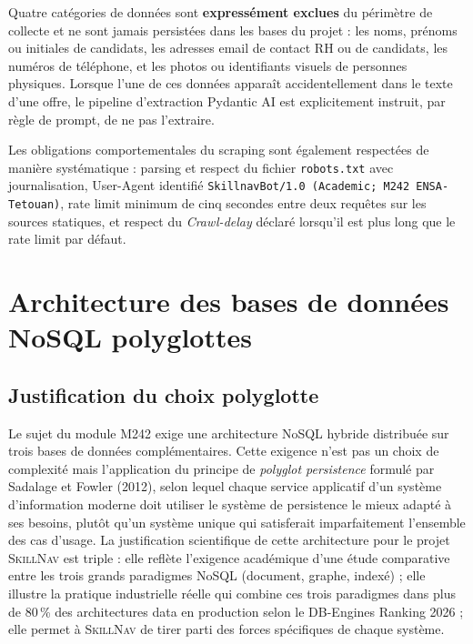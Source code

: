 \documentclass[11pt,a4paper,openany]{report}
\newcommand{\skillnav}{\textsc{SkillNav}\xspace}
\begin{document}
Quatre cat\'egories de donn\'ees sont \textbf{express\'ement exclues} du p\'erim\`etre de collecte et ne sont jamais persist\'ees dans les bases du projet : les noms, pr\'enoms ou initiales de candidats, les adresses email de contact RH ou de candidats, les num\'eros de t\'el\'ephone, et les photos ou identifiants visuels de personnes physiques. Lorsque l'une de ces donn\'ees appara\^it accidentellement dans le texte d'une offre, le pipeline d'extraction Pydantic AI est explicitement instruit, par r\`egle de prompt, de ne pas l'extraire.

Les obligations comportementales du scraping sont \'egalement respect\'ees de mani\`ere syst\'ematique : parsing et respect du fichier \texttt{robots.txt} avec journalisation, User-Agent identifi\'e \texttt{SkillnavBot/1.0 (Academic; M242 ENSA-Tetouan)}, rate limit minimum de cinq secondes entre deux requ\^etes sur les sources statiques, et respect du \emph{Crawl-delay} d\'eclar\'e lorsqu'il est plus long que le rate limit par d\'efaut.

\section{Architecture des bases de donn\'ees NoSQL polyglottes}

\subsection{Justification du choix polyglotte}

Le sujet du module M242 exige une architecture NoSQL hybride distribu\'ee sur trois bases de donn\'ees compl\'ementaires. Cette exigence n'est pas un choix de complexit\'e mais l'application du principe de \emph{polyglot persistence} formul\'e par Sadalage et Fowler (2012), selon lequel chaque service applicatif d'un syst\`eme d'information moderne doit utiliser le syst\`eme de persistence le mieux adapt\'e \`a ses besoins, plut\^ot qu'un syst\`eme unique qui satisferait imparfaitement l'ensemble des cas d'usage. La justification scientifique de cette architecture pour le projet \skillnav est triple : elle refl\`ete l'exigence acad\'emique d'une \'etude comparative entre les trois grands paradigmes NoSQL (document, graphe, index\'e) ; elle illustre la pratique industrielle r\'eelle qui combine ces trois paradigmes dans plus de 80\,\% des architectures data en production selon le DB-Engines Ranking 2026 ; elle permet \`a \skillnav de tirer parti des forces sp\'ecifiques de chaque syst\`eme.
\end{document}
